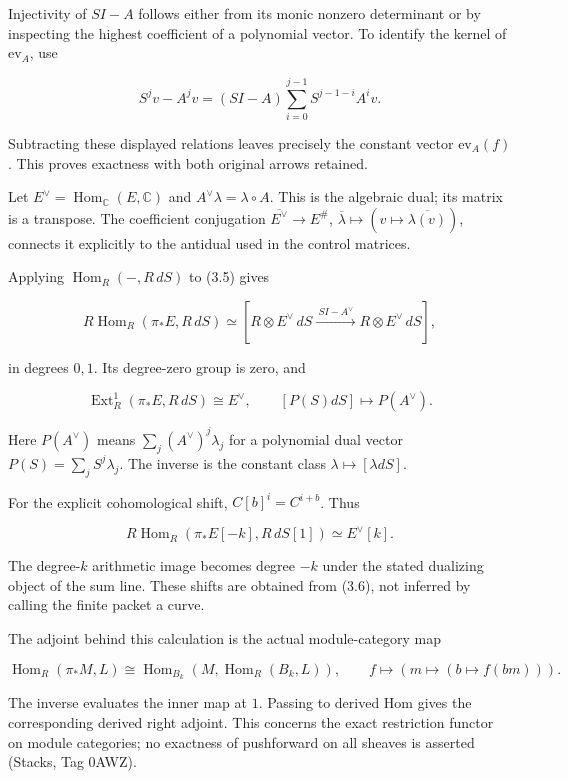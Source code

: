 Injectivity of \(SI-A\) follows either from its monic nonzero
determinant or by inspecting the highest coefficient of a polynomial
vector. To identify the kernel of \(\mathrm{ev}_A\), use

\[S^jv-A^jv=(SI-A)\sum_{i=0}^{j-1}S^{j-1-i}A^iv.\]

Subtracting these displayed relations leaves precisely the constant
vector \(\mathrm{ev}_A(f)\). This proves exactness with both original
arrows retained.

Let \(E^\vee=\operatorname{Hom}_\mathbb C(E,\mathbb C)\) and
\(A^\vee\lambda=\lambda\circ A\). This is the algebraic dual; its matrix
is a transpose. The coefficient conjugation
\(\overline{E^\vee}\to E^\#\),
\(\overline\lambda\mapsto(v\mapsto\overline{\lambda(v)})\), connects it
explicitly to the antidual used in the control matrices.

Applying \(\operatorname{Hom}_R(-,R\,dS)\) to (3.5) gives

\[R\operatorname{Hom}_R(\pi_*E,R\,dS)
\simeq [R\otimes E^\vee\,dS\xrightarrow{\ S I-A^\vee\ }R\otimes E^\vee\,dS],\tag{3.6}\]

in degrees \(0,1\). Its degree-zero group is zero, and

\[\boxed{\operatorname{Ext}^1_R(\pi_*E,R\,dS)\cong E^\vee,\qquad
[P(S)dS]\mapsto P(A^\vee).}\tag{3.7}\]

Here \(P(A^\vee)\) means \(\sum_j(A^\vee)^j\lambda_j\) for a polynomial
dual vector \(P(S)=\sum_jS^j\lambda_j\). The inverse is the constant
class \(\lambda\mapsto[\lambda dS]\).

For the explicit cohomological shift, \(C[b]^i=C^{i+b}\). Thus

\[R\operatorname{Hom}_R(\pi_*E[-k],R\,dS[1])\simeq E^\vee[k].\tag{3.8}\]

The degree-\(k\) arithmetic image becomes degree \(-k\) under the stated
dualizing object of the sum line. These shifts are obtained from (3.6),
not inferred by calling the finite packet a curve.

The adjoint behind this calculation is the actual module-category map

\[\operatorname{Hom}_R(\pi_*M,L)\cong
\operatorname{Hom}_{B_k}(M,\operatorname{Hom}_R(B_k,L)),\qquad
f\mapsto(m\mapsto(b\mapsto f(bm))).\tag{3.9}\]

The inverse evaluates the inner map at \(1\). Passing to derived Hom
gives the corresponding derived right adjoint. This concerns the exact
restriction functor on module categories; no exactness of pushforward on
all sheaves is asserted (Stacks, Tag 0AWZ).

